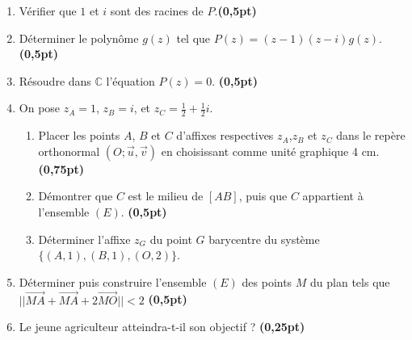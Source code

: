 \documentclass[12pt]{article}
\begin{document}
\renewcommand{\labelenumi}{\theenumi)}
\begin{enumerate}[label=\arabic*)]
    \item Vérifier que \(1\) et \(i\) sont des racines de \(P\).\hfill\textbf{(0,5pt)}
    \item Déterminer le polynôme \( g(z) \) tel que \( P(z) = (z-1)(z-i)g(z) \).\hfill\textbf{(0,5pt)}
    \item  Résoudre dans \( \mathbb{C} \) l'équation \( P(z) = 0 \). \hfill\textbf{(0,5pt)}
    \item On pose \( z_A = 1 \), \( z_B = i \), et \( z_C = \frac{1}{2}+\frac{1}{2}i \).
    \begin{enumerate}[label=\alph*)]
        \item Placer les points $A$, $B$ et $C$ d'affixes respectives $z_A$,$z_B$ et $z_C$ dans le repère orthonormal \( (O; \vec{u}, \vec{v}) \) en
        choisissant comme unité graphique 4 cm.\hfill\textbf{(0,75pt)}
        \item Démontrer que \( C \) est le milieu de \( [AB] \), puis que $C$ appartient à l'ensemble $(E)$. \hfill\textbf{(0,5pt)}
        \item  Déterminer l'affixe $z_G$ du point \( G \) barycentre du système \( \{(A,1), (B,1), (O,2)\} \). 
    \end{enumerate}
    \item  Déterminer puis construire l'ensemble $(E)$ des points $M$ du plan tels que\\ $||\overrightarrow{MA} + \overrightarrow{MA} + 2\overrightarrow{MO}||
 < 2$ \hfill\textbf{(0,5pt)}
    \item  Le jeune agriculteur atteindra-t-il son objectif ? \hfill\textbf{(0,25pt)}
    
\end{enumerate}
\end{document}
